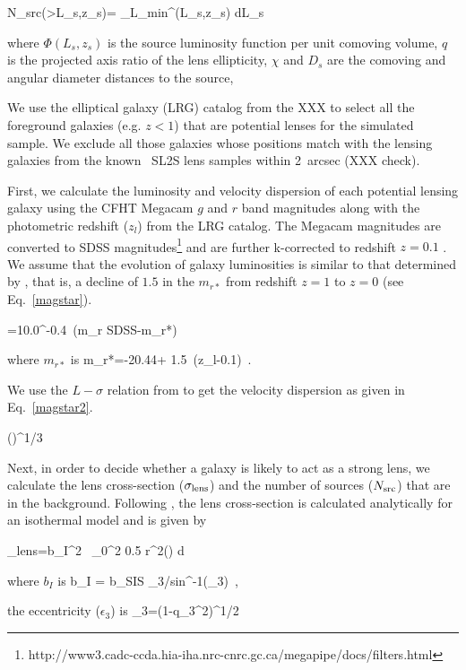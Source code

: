 \documentclass[useAMS,usenatbib,a4paper]{mn2e}
\begin{document}
\be
\label{eqn:nlum}
 N_{\rm src}(>L_s,z_s)= \int_{L_{min}}^\infty \Phi(L_s,z_s) {\rm d}L_s
\ee

where $\Phi(L_s,z_s)$ is the source luminosity function per unit comoving
volume, $q$ is the projected axis ratio of the lens ellipticity, $\chi$ and
$D_s$ are the comoving and angular diameter distances to the source,

We use the elliptical galaxy (LRG) catalog from the \cfhtls XXX to select
all the foreground galaxies (e.g. $z<1$) that are potential lenses for the
simulated sample. We exclude all those galaxies whose positions match with the
lensing galaxies from the known \cfhtls~SL2S lens samples \cite{More2012}
within 2~arcsec (XXX check). 

First, we calculate the luminosity and velocity dispersion of each potential
lensing galaxy using the CFHT Megacam $g$ and $r$ band magnitudes along with the
photometric redshift ($z_l$) from the LRG catalog.  The Megacam magnitudes are
converted to SDSS magnitudes\footnote{
    http://www3.cadc-ccda.hia-iha.nrc-cnrc.gc.ca/megapipe/docs/filters.html} and
are further k-corrected to redshift $z=0.1$ \citep{Frei1994}. We assume that the
evolution of galaxy luminosities is similar to that determined by
\citep{Faber2007}, that is, a decline of $1.5$ in the $m_{r*}$ from redshift $z=1$
to $z=0$ (see Eq.~\ref{magstar}). 

\be
{}=10.0^{-0.4~(m_{r \rm SDSS}-m_{r*})} 
\ee

where $m_{r*}$ is
\be
\label{magstar}
m_{r*}=-20.44+ 1.5~(z_{l}-0.1) \,.
\ee

We use the $L-\sigma$ relation from
\citep{Parker2007} to get the velocity dispersion as given in Eq.~\ref{magstar2}.

\be
\label{magstar2}
 \left(\right)^{1/3} 
\ee

Next, in order to decide whether a galaxy is likely to act as a strong lens, we
calculate the lens cross-section ($\sigma_{\rm lens}$) and the number of sources
($N_{\rm src}$) that are in the background. Following \citep{Keeton2000a}, the lens
cross-section is calculated analytically for an isothermal model and is given by 

\be
\sigma_{\rm lens}=b_I^2 \, \int_0^{2\pi} 0.5 r^2(\theta) d\theta
\ee

where $b_I$ is 
\be
b_I = b_{\rm SIS} \epsilon_3/sin^{-1}(\epsilon_3) \,,
\ee

the eccentricity ($\epsilon_3$) is 
\be
\epsilon_3=(1-q_3^2)^{1/2}
\ee
\end{document}
